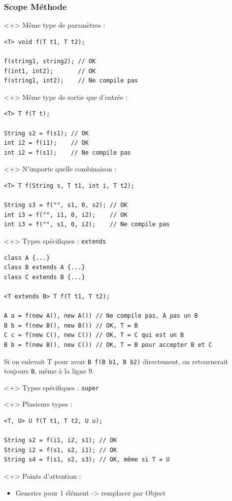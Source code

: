 \documentclass[draft]{beamer}
\DeclareRobustCommand{\todo}[1]{\ifdraft{\textbf{\textcolor{red}{[#1]}}}{}}
\begin{document}
\begin{frame}[fragile]
\frametitle{Scope Méthode}
\todo{Faire 1 slide/cas : contexte, problème, solution avec generics}
\begin{onlyenv}<+>
Même type de paramètres :
\begin{lstlisting}
<T> void f(T t1, T t2);

f(string1, string2); // OK
f(int1, int2);       // OK
f(string1, int2);    // Ne compile pas
\end{lstlisting}
\end{onlyenv}
\begin{onlyenv}<+>
Même type de sortie que d'entrée :
\begin{lstlisting}
<T> T f(T t);

String s2 = f(s1); // OK
int i2 = f(i1);    // OK
int i2 = f(s1);    // Ne compile pas
\end{lstlisting}
\end{onlyenv}
\begin{onlyenv}<+>
N'importe quelle combinaison :
\begin{lstlisting}
<T> T f(String s, T t1, int i, T t2);

String s3 = f("", s1, 0, s2); // OK
int i3 = f("", i1, 0, i2);    // OK
int i3 = f("", s1, 0, i2);    // Ne compile pas
\end{lstlisting}
\end{onlyenv}
\begin{onlyenv}<+>
Types spécifiques : \lstinline{extends}
\begin{lstlisting}
class A {...}
class B extends A {...}
class C extends B {...}

<T extends B> T f(T t1, T t2);

A a = f(new A(), new A()) // Ne compile pas, A pas un B
B b = f(new B(), new B()) // OK, T = B
C c = f(new C(), new C()) // OK, T = C qui est un B
B b = f(new B(), new C()) // OK, T = B pour accepter B et C
\end{lstlisting}
Si on enlevait T pour avoir \lstinline{B f(B b1, B b2)} directement, on retournerait toujours \lstinline{B}, même à la ligne 9.
\end{onlyenv}
\begin{onlyenv}<+>
Types spécifiques : \lstinline{super}
\todo{todo}
\end{onlyenv}
\begin{onlyenv}<+>
Plusieurs types :
\begin{lstlisting}
<T, U> U f(T t1, T t2, U u);

String s2 = f(i1, i2, s1); // OK
String i2 = f(s1, s2, i1); // OK
String s4 = f(s1, s2, s3); // OK, même si T = U
\end{lstlisting}
\end{onlyenv}
\begin{onlyenv}<+>
Points d'attention :
\begin{itemize}
 \item Generics pour 1 élément -> remplacer par Object
\end{itemize}
\end{onlyenv}
\end{frame}
\end{document}

